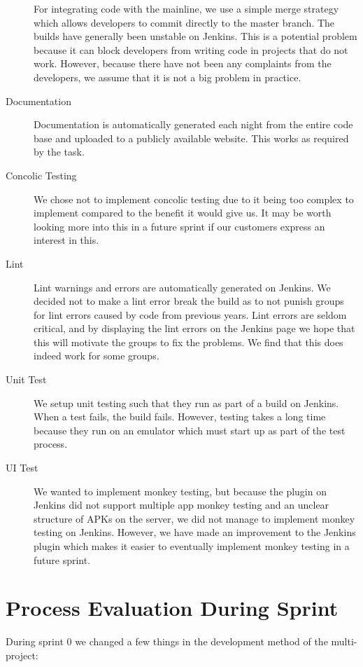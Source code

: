 \begin{description}
  For integrating code with the mainline, we use a simple merge strategy which allows developers to commit directly to the master branch. The builds have generally been unstable on Jenkins. This is a potential problem because it can block developers from writing code in projects that do not work. However, because there have not been any complaints from the developers, we assume that it is not a big problem in practice.
  \item[Documentation] Documentation is automatically generated each night from the entire code base and uploaded to a publicly available website. This works as required by the task.
  \item[Concolic Testing] We chose not to implement concolic testing due to it being too complex to implement compared to the benefit it would give us. It may be worth looking more into this in a future sprint if our customers express an interest in this.
  \item[Lint] Lint warnings and errors are automatically generated on Jenkins. We decided not to make a lint error break the build as to not punish groups for lint errors caused by code from previous years. Lint errors are seldom critical, and by displaying the lint errors on the Jenkins page we hope that this will motivate the groups to fix the problems. We find that this does indeed work for some groups.
  \item[Unit Test] We setup unit testing such that they run as part of a build on Jenkins. When a test fails, the build fails. However, testing takes a long time because they run on an emulator which must start up as part of the test process.
  \item[UI Test] We wanted to implement monkey testing, but because the plugin on Jenkins did not support multiple app monkey testing and an unclear structure of APKs on the server, we did not manage to implement monkey testing on Jenkins. However, we have made an improvement to the Jenkins plugin which makes it easier to eventually implement monkey testing in a future sprint.
\end{description}

\section{Process Evaluation During Sprint}
During sprint 0 we changed a few things in the development method of the multi-project:

